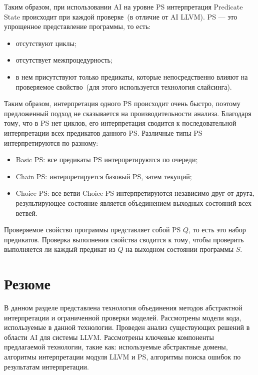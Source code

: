 Таким образом, при использовании AI на уровне PS интерпретация Predicate 
State происходит при каждой проверке~(в отличие от AI LLVM). PS --- это
упрощенное представление программы, то есть:
\begin{itemize}
\item отсутствуют циклы;
\item отсутствует межпроцедурность;
\item в нем присутствуют только предикаты, которые непосредственно влияют на 
проверяемое свойство~(для этого используется технология слайсинга).
\end{itemize}

Таким образом, интерпретация одного PS происходит очень быстро, поэтому 
предложенный подход не сказывается на производительности анализа. Благодаря 
тому, что в PS нет циклов, его интерпретация сводится к последовательной 
интерпретации всех предикатов данного PS. Различные типы PS интерпретируются 
по разному:
\begin{itemize}
\item Basic PS: все предикаты PS интерпретируются по очереди;
\item Chain PS: интерпретируется базовый PS, затем текущий;
\item Choice PS: все ветви Choice PS интерпретируются независимо друг от
друга, результирующее состояние является объединением выходных состояний всех
ветвей.
\end{itemize}

Проверяемое свойство программы представляет собой PS $Q$, то есть это набор 
предикатов. Проверка выполнения свойства сводится к тому, чтобы проверить
выполняется ли каждый предикат из $Q$ на выходном состоянии программы $S$.

\section{Резюме}
В данном разделе представлена технология объединения методов абстрактной
интерпретации и ограниченной проверки моделей. Рассмотрены модели кода, 
используемые в данной технологии. Проведен анализ существующих решений в 
области AI для системы LLVM. Рассмотрены ключевые компоненты предлагаемой
технологии, такие как: используемые абстрактные домены, алгоритмы интерпретации
модуля LLVM и PS, алгоритмы поиска ошибок по результатам интерпретации.